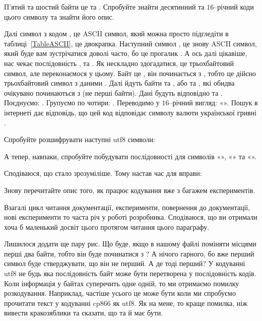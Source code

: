 \begin{exercise}
П'ятий та шостий байти це  та .
Спробуйте знайти десятинний та $16$--річний коди цього символу та знайти його опис.
\end{exercise}

Далі символ з кодом , це ASCII символ, який можна просто підгледіти в таблиці~\ref{TableASCII}, це двокрапка.
Наступний символ , це знову ASCII символ, який буде вам зустрічатися доволі часто, бо це прогалик \chr{\s}.
А ось далі цікавіше, нас чекає послідовність ,  та .
Як нескладно здогадатися, це трьохбайтовий символ, але переконаємося у цьому.
Байт  це , він починається з , тобто це дійсно трьохбайтовий символ з даними .
Далі йдуть байти  та , або  та , які обидва очікувано починаються з  (не перші байти).
Дані будуть відповідно  та .
Поєднуємо: .
Групуємо по чотири: .
Переводимо у $16$--річний вигляд: «».
Пошук в інтернеті дає відповідь, що цей код відповідає символу валюти української гривні .

\begin{exercise}
Спробуйте розшифрувати наступні utf8 символи:
\end{exercise}

\begin{exercise}
А тепер, навпаки, спробуйте побудувати  послідовності для символів «», «» та «».
\end{exercise}

Сподіваюся, що стало зрозуміліше.
Тому настав час для вправи:

\begin{exercise}
Знову перечитайте опис того, як працює кодування  вже з багажем експериментів.
\end{exercise}

Взагалі цикл читання документації, експерименти, повернення до документації, нові експерименти то часта річ у роботі розробника.
Сподіваюся, що ви отримали хоча б маленький досвіт цього протягом читання цього параграфу.

\medskip

Лишилося додати ще пару рис.
Що буде, якщо в нашому файлі поміняти місцями перші два байти, тобто він буде починатися з ?
А нічого гарного, бо вже перший символ буде стверджувати, що він не перший.
А де тоді перший?
У кодуванні utf8 не будь яка послідовність байт може бути перетворена у послідовність кодів.
Коли інформація у байтах суперечить одне одній, то ми отримаємо помилку розкодування.
Наприклад, частіше усього це може бути коли ми спробуємо прочитати текст у кодуванні cp866 як utf8.
Як на мене, то краще помилка, ніж вивести кракозяблики та сказати, що та й має бути.

